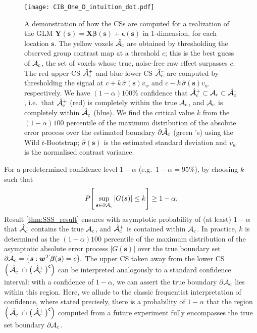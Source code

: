 \begin{figure}[htbp]
\hspace*{-1.5cm}
\label{fig:one_d_intuiton}%
\centering
    \texttt{[image: CIB\_One\_D\_intuition\_dot.pdf]}
\caption{A demonstration of how the CSs are computed for a realization of the GLM $\bm{Y}(\bm{s}) = \bm{X}\bm{\beta}(\bm{s}) + \bm{\epsilon}(\bm{s})$ in 1-dimension, for each location $\bm{s}$.
The yellow voxels $\operatorname{\hat{\mathcal{A}}_{c}}$ are obtained by thresholding the observed group contrast map at a threshold $c$; this is the best guess of $\operatorname{\mathcal{A}_{c}}$, the set of voxels whose true, noise-free raw effect surpasses $c$. 
The red upper CS $\operatorname{\hat{\mathcal{A}}_{c}^+}$ and blue lower CS $\operatorname{\hat{\mathcal{A}}_{c}^{\textrm{--}}}$ are computed by thresholding the signal at  $c + k\, \hat{\sigma}(\bm{s}) v_{w}$ and $c - k\, \hat{\sigma}(\bm{s}) v_{w}$ respectively. 
We have $(1-\alpha)100\%$ confidence that $\operatorname{\hat{\mathcal{A}}_{c}^+} \subset \operatorname{\mathcal{A}_{c}} \subset \operatorname{\hat{\mathcal{A}}_{c}^{\textrm{--}}}$, i.e.~that $\operatorname{\hat{\mathcal{A}}_{c}^+}$ (red) is completely within the true $\operatorname{\mathcal{A}_{c}}$, and $\operatorname{\mathcal{A}_{c}}$ is completely within $\operatorname{\hat{\mathcal{A}}_{c}^{\textrm{--}}}$ (blue). 
We find the critical value $k$ from the $(1-\alpha)100$ percentile of the maximum distribution of the absolute error process over the estimated boundary $\operatorname{\partial\hat{\mathcal{A}}_{c}}$ (green \newmoon's) using the Wild $t$-Bootstrap; $\hat\sigma(\bm{s})$ is the estimated standard deviation and $v_w$ is the normalised contrast variance.}
\end{figure}

For a predetermined confidence level $1 - \alpha$ (e.g.\ $1 - \alpha = 95\%$),  by choosing $k$ such that 
\begin{equation}
\label{eq:probability_statement}
P \Bigg[\sup_{\bm{s}\in\operatorname{\partial\mathcal{A}_{c}}}|G(\bm{s})|\leq k\Bigg] \geq 1-\alpha,
\end{equation}
Result \ref{thm:SSS_result} ensures with asymptotic probability of (at least) $1 - \alpha$ that $\operatorname{\hat{\mathcal{A}}_{c}^{\textrm{--}}}$ contains the true  $\operatorname{\mathcal{A}_{c}}$,  and $\operatorname{\hat{\mathcal{A}}_{c}^+}$ is contained within $\operatorname{\mathcal{A}_{c}}$. In practice,  $k$ is determined as the $(1-\alpha)100$ percentile of the maximum distribution of the asymptotic absolute error process $|G(\bm{s})|$ over the true boundary set $\operatorname{\partial\mathcal{A}_{c}} = \{\bm{s} : \bm{w}^{T}\bm{\beta}(\bm{s}) = c\}.$ The upper CS taken away from the lower CS $\Big(\Ahatcm \ \cap \ \big(\Ahatcp\big)^{\mathsf{c}}\Big)$ can be interpreted analogously to a standard confidence interval: with a confidence of $1 - \alpha$, we can assert the true boundary $\operatorname{\partial\mathcal{A}_{c}}$ lies within this region. Here, we allude to the classic frequentist interpretation of confidence, where stated precisely, there is a probability of $1 - \alpha$ that the region $\Big(\Ahatcm \ \cap \ \big(\Ahatcp\big)^{\mathsf{c}}\Big)$ computed from a future experiment fully encompasses the true set boundary $\operatorname{\partial\mathcal{A}_{c}}$.

